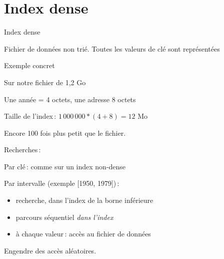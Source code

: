 \section{Index dense}
\begin{frame}{Index dense}


\vfill

\begin{blocgauche}
\alert{Fichier de données non trié. Toutes les valeurs de clé sont représentées}
\end{blocgauche}

\end{frame}
\begin{frame}{Exemple concret}

Sur notre fichier de 1,2 Go
\begin{redbullet}
  \item Une année = 4 octets, une adresse 8 octets
   \item Taille de l'index\,: $1\,000\,000 * (4 + 8)=12$ Mo
\end{redbullet}

Encore 100 fois plus petit que le fichier.

\vfill

Recherches\,:
\begin{redbullet}
  \item Par clé\,: comme sur un index non-dense

   \item Par intervalle (exemple [1950, 1979])\,:
     \begin{itemize}
       \item recherche, dans l'index de la borne inférieure
       \item parcours séquentiel {\em dans l'index}
      \item à chaque valeur\,: accès au fichier de données
   \end{itemize}
   \alert{Engendre des accès aléatoires.}
\end{redbullet}


\end{frame}
